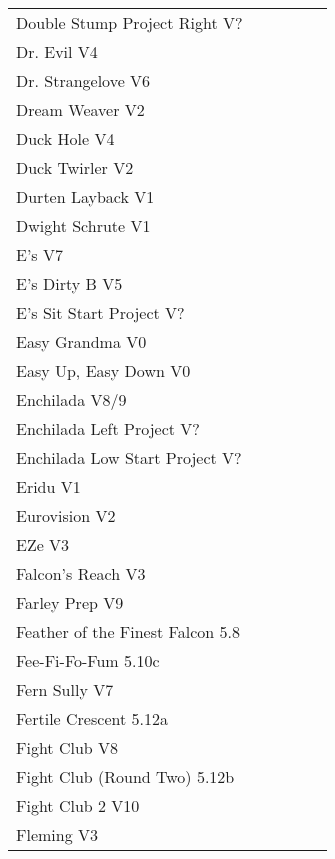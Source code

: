 \begin{flushleft}
\begin{center}
\begin{supertabular}{p{0.76\linewidth}p{0.08\linewidth}}
Double Stump Project Right V? & \pageref{vr:Double Stump Project Right} \\
Dr. Evil V4 & \pageref{rt:Dr. Evil} \\
Dr. Strangelove V6 & \pageref{rt:Dr. Strangelove} \\
Dream Weaver V2 & \pageref{vr:Dream Weaver} \\
Duck Hole V4 & \pageref{rt:DT 1} \\
Duck Twirler V2 & \pageref{rt:Duck Twirler} \\
Durten Layback V1 & \pageref{rt:Durten Layback} \\
Dwight Schrute V1 & \pageref{rt:Dwight Schrute} \\
E's V7 & \pageref{rt:E's} \\
E's Dirty B V5 & \pageref{rt:E's Dirty B} \\
E's Sit Start Project V? & \pageref{vr:E's Sit Start Project} \\
Easy Grandma V0 & \pageref{rt:Easy Grandma} \\
Easy Up, Easy Down V0 & \pageref{rt:Easy Up, Easy Down} \\
Enchilada V8/9 & \pageref{rt:Enchilada} \\
Enchilada Left Project V? & \pageref{vr:Enchilada Left Project} \\
Enchilada Low Start Project V? & \pageref{vr:Enchilada Low Start Project} \\
Eridu V1 & \pageref{rt:Eridu} \\
Eurovision V2 & \pageref{rt:Eurovision} \\
EZe V3 & \pageref{vr:EZe} \\
Falcon's Reach V3 & \pageref{rt:Falcon's Reach} \\
Farley Prep V9 & \pageref{rt:Farley Prep} \\
Feather of the Finest Falcon 5.8 & \pageref{rt:Feather of the Finest Falcon} \\
Fee-Fi-Fo-Fum 5.10c & \pageref{rt:Fee-Fi-Fo-Fum} \\
Fern Sully V7 & \pageref{rt:Fern Sully} \\
Fertile Crescent 5.12a & \pageref{rt:Fertile Crescent} \\
Fight Club V8 & \pageref{rt:Fight Club} \\
Fight Club (Round Two) 5.12b & \pageref{rt:Fight Club (Round Two)} \\
Fight Club 2 V10 & \pageref{rt:Fight Club 2} \\
Fleming V3 & \pageref{rt:Fleming} \\

\end{supertabular}
\end{center}
\end{flushleft}
